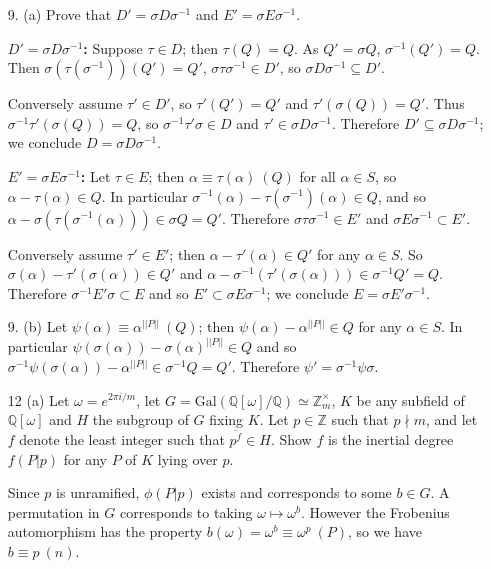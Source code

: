 \documentclass{article}
\newcommand{\w}[0]{\omega}
\newcommand{\Q}[0]{\mathbb{Q}}
\newcommand{\Z}[0]{\mathbb{Z}}
\newcommand{\modequiv}[3]{#1 \equiv #2\ (#3)}
\newcommand{\gal}[2]{\text{Gal}(#1 / #2)}
\begin{document}
\begin{enumerate}
\item[9. (a)] Prove that $D' = \sigma D \sigma^{-1}$ and $E' = \sigma E \sigma^{-1}$.

{\bf $D' = \sigma D \sigma^{-1}$:} Suppose $\tau \in D$; then $\tau(Q) = Q$.  As $Q' = \sigma Q$, $\sigma^{-1}(Q') = Q$.  Then $\sigma(\tau(\sigma^{-1}))(Q') = Q'$, $\sigma \tau \sigma^{-1} \in D'$, so $\sigma D \sigma^{-1} \subseteq D'$.

Conversely assume $\tau' \in D'$, so $\tau'(Q') = Q'$ and $\tau'(\sigma(Q)) = Q'$. Thus $\sigma^{-1} \tau'(\sigma(Q)) = Q$, so $\sigma^{-1} \tau' \sigma \in D$ and $\tau' \in \sigma D \sigma^{-1}$.  Therefore $D' \subseteq \sigma D \sigma^{-1}$; we conclude $D = \sigma D \sigma^{-1}$.

{\bf $E' = \sigma E \sigma^{-1}$: } Let $\tau \in E$; then $\modequiv{\alpha}{\tau(\alpha)}{Q}$ for all $\alpha \in S$, so $\alpha - \tau(\alpha) \in Q$.  In particular $\sigma^{-1}(\alpha) - \tau(\sigma^{-1})(\alpha) \in Q$, and so $\alpha - \sigma(\tau(\sigma^{-1}(\alpha))) \in \sigma Q = Q'$.  Therefore $\sigma \tau \sigma^{-1} \in E'$ and $\sigma E \sigma^{-1} \subset E'$.

Conversely assume $\tau' \in E'$; then $\alpha - \tau'(\alpha) \in Q'$ for any $\alpha \in S$.  So $\sigma(\alpha) - \tau'(\sigma(\alpha)) \in Q'$ and $\alpha - \sigma^{-1}(\tau'(\sigma(\alpha))) \in \sigma^{-1}Q' = Q$.  Therefore $\sigma^{-1} E' \sigma \subset E$ and so $E' \subset \sigma E \sigma^{-1}$; we conclude $E = \sigma E' \sigma^{-1}$.

\item [9. (b)] Let $\modequiv{\psi(\alpha)}{\alpha^{||P||}}{Q}$; then $\psi(\alpha) - \alpha^{||P||} \in Q$ for any $\alpha \in S$.  In particular $\psi(\sigma(\alpha)) - \sigma(\alpha)^{||P||} \in Q$ and so $\sigma^{-1}\psi(\sigma(\alpha)) - \alpha^{||P||} \in \sigma^{-1}Q = Q'$.  Therefore $\psi' = \sigma^{-1}\psi \sigma$.

\item [12 (a)]  Let $\w = e^{2\pi i / m}$, let $G = \gal{\Q[\omega]}{\Q} \simeq \Z^{\times}_{m}$, $K$ be any subfield of $\Q[\omega]$ and $H$ the subgroup of $G$ fixing $K$.  Let $p \in \Z$ such that $p \nmid m$, and let $f$ denote the least integer such that $\overline{p^f} \in H$.  Show $f$ is the inertial degree $f(P | p)$ for any $P$ of $K$ lying over $p$.

Since $p$ is unramified, $\phi(P | p)$ exists and corresponds to some $b \in G$.  A permutation in $G$ corresponds to taking $\w \mapsto \w^b$.  However the Frobenius automorphism has the property $b(\omega) = \modequiv{\w^{b}}{\w^{p}}{P}$, so we have $\modequiv{b}{p}{n}$.


\end{enumerate}
\end{document}
